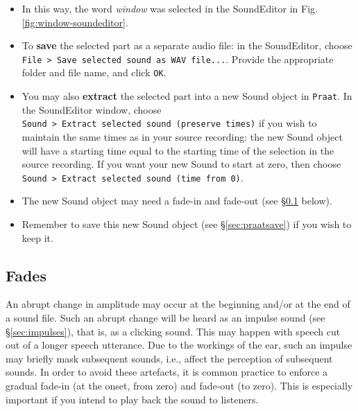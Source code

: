 \documentclass[
]{book}
\providecommand{\tightlist}{%
  \setlength{\itemsep}{0pt}\setlength{\parskip}{0pt}}
\begin{document}
\begin{itemize}
  \begin{itemize}
  \tightlist
  \item
    put the cursor in the approximate area where the boundary should be located;
  \item
    choose \texttt{Sound\ \textgreater{}\ Move\ cursor\ to\ nearest\ zero\ crossing};
  \item
    ask \texttt{Praat} to report the cursor location in its Info window: \texttt{Time\ :\ Get\ cursor}, and note this time;
  \item
    do this for both start and end of the selection part;
  \item
    use these noted times to set the selection part as described above.
  \end{itemize}
\item
  In this way, the word \emph{window} was selected in the SoundEditor in Fig.\ref{fig:window-soundeditor}.
\item
  To \textbf{save} the selected part as a separate audio file: in the SoundEditor, choose \texttt{File\ \textgreater{}\ Save\ selected\ sound\ as\ WAV\ file...}.
  Provide the appropriate folder and file name, and click \texttt{OK}.
\item
  You may also \textbf{extract} the selected part into a new Sound object in \texttt{Praat}. In the SoundEditor window, choose \texttt{Sound\ \textgreater{}\ Extract\ selected\ sound\ (preserve\ times)} if you wish to maintain the same times as in your source recording: the new Sound object will have a starting time equal to the starting time of the selection in the source recording. If you want your new Sound to start at zero, then choose \texttt{Sound\ \textgreater{}\ Extract\ selected\ sound\ (time\ from\ 0)}.
\item
  The new Sound object may need a fade-in and fade-out (see §\ref{sec:fades} below).
\item
  Remember to save this new Sound object (see §\ref{sec:praatsave}) if you wish to keep it.
\end{itemize}

\protect{}\label{fades}
\subsection{Fades}\label{sec:fades}

An abrupt change in amplitude may occur at the beginning and/or at the end of a sound file. Such an abrupt change will be heard as an impulse sound (see §\ref{sec:impulses}), that is, as a clicking sound. This may happen with speech cut out of a longer speech utterance.
Due to the workings of the ear, such an impulse may briefly mask subsequent sounds, i.e., affect the perception of subsequent sounds. In order to avoid these artefacts, it is common practice to enforce a gradual fade-in (at the onset, from zero) and fade-out (to zero). This is especially important if you intend to play back the sound to listeners.
\end{document}
